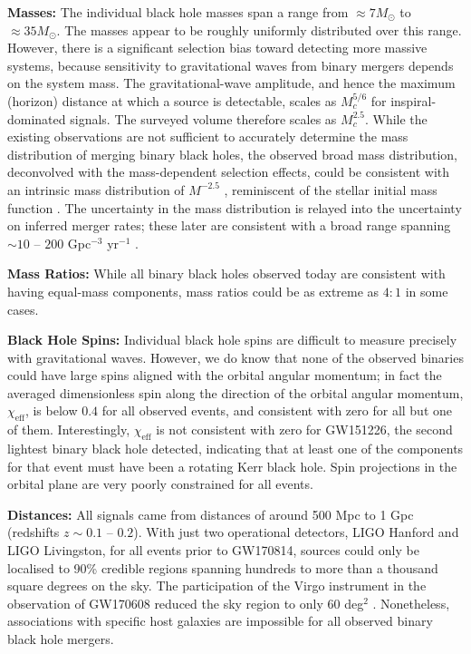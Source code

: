 \documentclass[iop,onecolumn]{revtex4}
\begin{document}
\textbf{Masses:} The individual black hole masses span a range from $\approx 7 M_\odot$ to $\approx 35 M_\odot$.  The masses appear to be roughly uniformly distributed over this range.  However, there is a significant selection bias  toward detecting more massive systems, because sensitivity to gravitational waves from binary mergers depends on the system mass.  The gravitational-wave amplitude, and hence the maximum (horizon) distance at which a source is detectable, scales as $M_c^{5/6}$ for inspiral-dominated signals. The surveyed volume therefore scales as $M_c^{2.5}$.  While the existing observations are not sufficient to accurately determine the mass distribution of merging binary black holes, the observed broad mass distribution, deconvolved with the mass-dependent selection effects, could be consistent with an intrinsic mass distribution of $M^{-2.5}$ \citep{BBH:O1}, reminiscent of the stellar initial mass function \citep{Salpeter:1955}.  The uncertainty in the mass distribution is relayed into the uncertainty on inferred merger rates; these later are consistent with a broad range spanning $\sim 10$ -- $200$ Gpc$^{-3}$ yr$^{-1}$ \citep{GW170104}.  

\textbf{Mass Ratios:} While all binary black holes observed today are consistent with having equal-mass components, mass ratios could be as extreme as $4:1$ in some cases.  

\textbf{Black Hole Spins:} Individual black hole spins are difficult to measure precisely with gravitational waves.  However, we do know that none of the observed binaries could have large spins aligned with the orbital angular momentum; in fact the averaged dimensionless spin along the direction of the orbital angular momentum, $\chi_\textrm{eff}$, is below $0.4$ for all observed events, and consistent with zero for all but one of them.  Interestingly, $\chi_\textrm{eff}$ is not consistent with zero for GW151226, the second lightest binary black hole detected, indicating that at least one of the components for that event must have been a rotating Kerr black hole.  Spin projections in the orbital plane are very poorly constrained for all events.

\textbf{Distances:} All signals came from distances of around 500 Mpc to 1 Gpc (redshifts $z\sim 0.1$ -- $0.2$).  With just two operational detectors, LIGO Hanford and LIGO Livingston, for all events prior to GW170814, sources could only be localised to 90\% credible regions spanning hundreds to more than a thousand square degrees on the sky.  The participation of the Virgo instrument in the observation of GW170608 reduced the sky region to only 60 deg$^2$ \citep{GW170608}.  Nonetheless, associations with specific host galaxies are impossible for all observed binary black hole mergers.  
\end{document}
